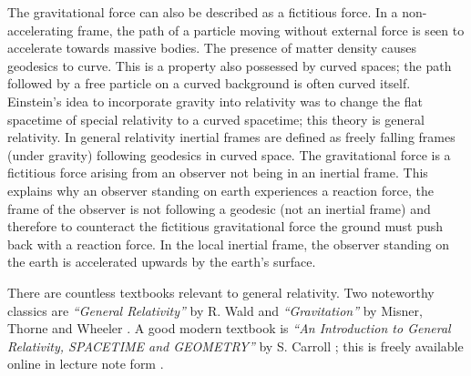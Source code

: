 The gravitational force can also be described as a fictitious force. In a non-accelerating frame, the path of a particle moving without external force is seen to accelerate towards massive bodies. The presence of matter density causes geodesics to curve. This is a property also possessed by curved spaces; the path followed by a free particle on a curved background is often curved itself. Einstein's idea to incorporate gravity into relativity was to change the flat spacetime of special relativity to a curved spacetime; this theory is general relativity.  In general relativity inertial frames are defined as freely falling frames (under gravity) following geodesics in curved space. The gravitational force is a fictitious force arising from an observer not being in an inertial frame. This explains why an observer standing on earth experiences a reaction force, the frame of the observer is not following a geodesic (not an inertial frame) and therefore to counteract the fictitious gravitational force the ground must push back with a reaction force. In the local inertial frame, the observer standing on the earth is accelerated upwards by the earth's surface.

There are countless textbooks relevant to general relativity. Two noteworthy
classics are {\it \enquote{General Relativity}} by R. Wald \cite{Wald1984} and
{\it \enquote{Gravitation}} by Misner, Thorne and Wheeler \cite{Misner1973}.
A good modern textbook is
{\it \enquote{An Introduction to General Relativity, SPACETIME and GEOMETRY}} by S. Carroll
\cite{carroll2019spacetime}; this is freely available online in
lecture note form \cite{Carroll:1997ar}.

